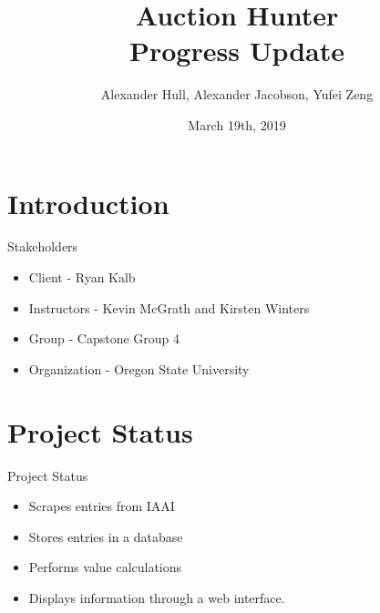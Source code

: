 \documentclass{beamer}
\title[Your Short Title]{Auction Hunter \\ Progress Update}
\author{Alexander Hull, Alexander Jacobson, Yufei Zeng}
\institute{CS 462 - Winter 2019}
\date{March 19th, 2019}
\begin{document}
\begin{frame}
  \titlepage
\end{frame}




\section{Introduction}

\begin{frame}{Stakeholders}
\begin{itemize}
  \setlength\itemsep{2em}
  \item Client - Ryan Kalb
  \item Instructors - Kevin McGrath and Kirsten Winters
  \item Group - Capstone Group 4 
  \item Organization - Oregon State University 
  
\end{itemize}
\end{frame}

\section{Project Status}
\begin{frame}{Project Status}
\begin{itemize}
\setlength\itemsep{2em}
\item Scrapes entries from IAAI
\item Stores entries in a database
\item Performs value calculations
\item Displays information through a web interface. 
\end{itemize}
\end{frame}
\end{document}
